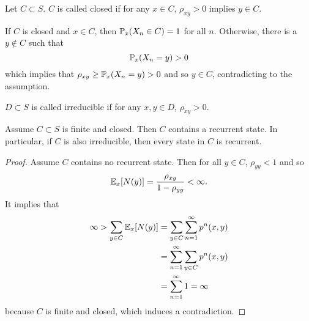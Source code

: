 \begin{defn}[Closedness]
    Let $C \subset S$. $C$ is called closed if for any $x \in C$, $\rho_{xy} > 0$ implies $y \in C$.
\end{defn}
\begin{rmk}
    If $C$ is closed and $x \in C$, then $\mathbb{P}_x (X_n \in C) = 1$ for all $n$. Otherwise, there is a $y \notin C$ such that
    \begin{equation*}
        \mathbb{P}_x(X_n =y) > 0
    \end{equation*}
    which implies that $\rho_{xy} \geq \mathbb{P}_x(X_n = y) > 0$ and so $y \in C$, contradicting to the assumption.
\end{rmk}

\begin{defn}[Irreducibility]
    $D \subset S$ is called irreducible if for any $x,y \in D$, $\rho_{xy} > 0$.
\end{defn}

\begin{thm}
    Assume $C \subset S$ is finite and closed. Then $C$ contains a recurrent state. In particular, if $C$ is also irreducible, then every state in $C$ is recurrent. 
\end{thm}
\begin{proof}
    Assume $C$ contains no recurrent state. Then for all $y \in C$, $\rho_{yy}  < 1$ and so
    \begin{equation*}
        \mathbb{E}_x[N(y)] = \frac{\rho_{xy}}{1 - \rho_{yy}} < \infty.
    \end{equation*}
    It implies that
    \begin{equation*}
        \begin{aligned}
            \infty > \sum_{y \in C}\mathbb{E}_x[N(y)] &= \sum_{y \in C} \sum_{n=1}^\infty p^n(x,y) \\
            &= \sum_{n=1}^\infty \sum_{y \in C}p^n(x,y) \\
            &= \sum_{n=1}^\infty 1 = \infty
        \end{aligned}
    \end{equation*}
    because $C$ is finite and closed, which induces a contradiction.
\end{proof}

